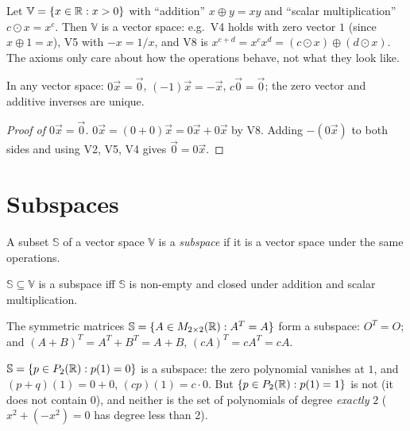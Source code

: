 \begin{example}
Let $\mathbb{V}=\{x\in\mathbb{R}:x>0\}$ with ``addition'' $x\oplus y=xy$ and ``scalar multiplication''
$c\odot x=x^c$. Then $\mathbb{V}$ is a vector space: e.g.\ V4 holds with zero vector $1$ (since $x\oplus1=x$),
V5 with $-x = 1/x$, and V8 is $x^{c+d}=x^cx^d=(c\odot x)\oplus(d\odot x)$. The axioms only care about how
the operations behave, not what they look like.
\end{example}

\begin{theorem}
In any vector space: $0\vec x=\vec0$, $(-1)\vec x=-\vec x$, $c\vec 0=\vec 0$; the zero vector and additive inverses are
unique.
\end{theorem}
\begin{proof}[Proof of $0\vec x=\vec 0$]
$0\vec x=(0+0)\vec x=0\vec x+0\vec x$ by V8. Adding $-(0\vec x)$ to both sides and using V2, V5, V4 gives
$\vec 0=0\vec x$.
\end{proof}

\section{Subspaces}

\begin{definition}
A subset $\mathbb{S}$ of a vector space $\mathbb{V}$ is a \emph{subspace} if it is a vector space under the same
operations.
\end{definition}

\begin{theorem}
$\mathbb{S}\subseteq\mathbb{V}$ is a subspace iff $\mathbb{S}$ is non-empty and closed under addition and scalar
multiplication.
\end{theorem}

\begin{example}
The symmetric matrices $\mathbb{S}=\{A\in M_{2\times 2}(\mathbb{R}):A^T=A\}$ form a subspace: $O^T=O$; and
$(A+B)^T=A^T+B^T=A+B$, $(cA)^T=cA^T=cA$.
\end{example}

\begin{example}
$\mathbb{S}=\{p\in P_{2}(\mathbb{R}):p(1)=0\}$ is a subspace: the zero polynomial vanishes at $1$, and
$(p+q)(1)=0+0$, $(cp)(1)=c\cdot0$. But $\{p\in P_{2}(\mathbb{R}):p(1)=1\}$ is not (it does not contain $0$), and
neither is the set of polynomials of degree \emph{exactly} $2$ ($x^2+(-x^2)=0$ has degree less than 2).
\end{example}


